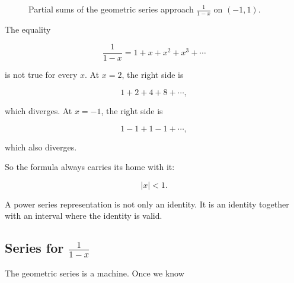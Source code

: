 \begin{figure}[h]
\centering
{}
\caption{Partial sums of the geometric series approach \(\frac1{1-x}\) on \((-1,1)\).}
\label{fig:geometric-partial-sums-function}
\end{figure}

The equality

\[
\frac1{1-x}=1+x+x^2+x^3+\cdots
\]

is not true for every \(x\).  At \(x=2\), the right side is

\[
1+2+4+8+\cdots,
\]

which diverges.  At \(x=-1\), the right side is

\[
1-1+1-1+\cdots,
\]

which also diverges.

So the formula always carries its home with it:

\[
\boxed{|x|<1.}
\]

A power series representation is not only an identity.  It is an identity together with
an interval where the identity is valid.

\subsection{\texorpdfstring{Series for \(\frac1{1-x}\)}{Series for 1/(1-x)}}
\label{subsec:series-for-one-over-one-minus-x}

The geometric series is a machine.  Once we know

